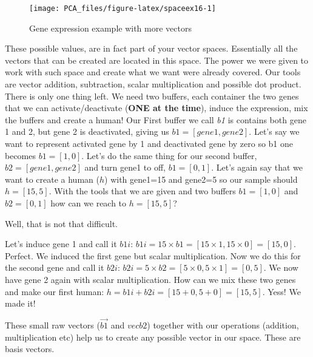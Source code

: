 \documentclass[
]{book}
\theoremstyle{definition}
\theoremstyle{definition}
\theoremstyle{definition}
\theoremstyle{remark}
\begin{document}
\begin{figure}

{\centering \texttt{[image: PCA\_files/figure-latex/spaceex16-1]} 

}

\caption{Gene expression example with more vectors}\label{fig:spaceex16}
\end{figure}

These possible values, are in fact part of your vector spaces. Essentially all the vectors that can be created are located in this space. The power we were given to work with such space and create what we want were already covered. Our tools are vector addition, subtraction, scalar multiplication and possible dot product. There is only one thing left. We need two buffers, each container the two genes that we can activate/deactivate (\textbf{ONE at the time}), induce the expression, mix the buffers and create a human! Our First buffer we call \emph{b1} is contains both gene 1 and 2, but gene 2 is deactivated, giving us \(b1=[gene1,gene2]\). Let's say we want to represent activated gene by 1 and deactivated gene by zero so b1 one becomes \(b1=[1,0]\). Let's do the same thing for our second buffer, \(b2=[gene1,gene2]\) and turn gene1 to off, \(b1=[0,1]\). Let's again say that we want to create a human (\(h\)) with gene1=15 and gene2=5 so our sample should \(h=[15,5]\). With the tools that we are given and two buffers \(b1=[1,0]\) and \(b2=[0,1]\) how can we reach to \(h=[15,5]\)?

Well, that is not that difficult.

Let's induce gene 1 and call it \(b1i\): \(b1i=15 \times b1=[15 \times 1, 15 \times 0]=[15,0]\). Perfect. We induced the first gene but scalar multiplication.
Now we do this for the second gene and call it \(b2i\): \(b2i=5 \times b2=[5 \times 0, 5 \times 1]=[0,5]\). We now have gene 2 again with scalar multiplication.
How can we mix these two genes and make our first human: \(h=b1i+b2i=[15+0,5+0]=[15,5]\). Yess! We made it!

These small raw vectors (\(\vec{b1}\) and \(vec{b2}\)) together with our operations (addition, multiplication etc) help us to create any possible vector in our space. These are basis vectors.
\end{document}
